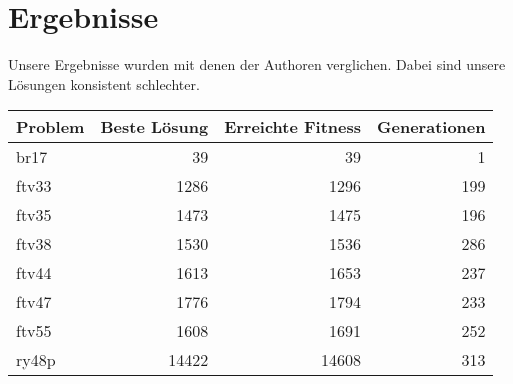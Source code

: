 \chapter{Ergebnisse}
Unsere Ergebnisse wurden mit denen der Authoren verglichen.  Dabei
sind unsere Lösungen konsistent schlechter.

{
  \setmainfont[Numbers={Uppercase,Monospaced}]{Vollkorn}
  \begin{tabular}{lrrr}
    Problem & Beste Lösung & Erreichte Fitness & Generationen \\
    \hline
    br17    & 39           & 39                & 1            \\
    ftv33   & 1286         & 1296              & 199          \\
    ftv35   & 1473         & 1475              & 196          \\
    ftv38   & 1530         & 1536              & 286          \\
    ftv44   & 1613         & 1653              & 237          \\
    ftv47   & 1776         & 1794              & 233          \\
    ftv55   & 1608         & 1691              & 252          \\
    ry48p   & 14422        & 14608             & 313          \\
  \end{tabular}
}
